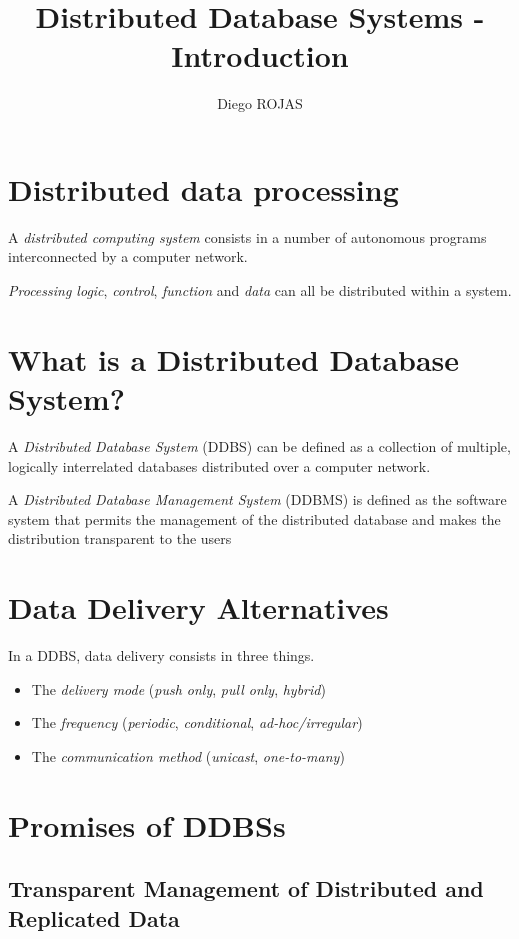 \documentclass[12pt]{article}
\title{Distributed Database Systems - Introduction}
\author{Diego ROJAS}
\begin{document}
\maketitle

\section{Distributed data processing}

A \textit{distributed computing system} consists in a number of autonomous programs interconnected by a computer network.

\textit{Processing logic}, \textit{control}, \textit{function} and \textit{data} can all be distributed within a system.

\section{What is a Distributed Database System?}

A \textit{Distributed Database System} (DDBS) can be defined as a collection of multiple, logically interrelated databases distributed over a computer network.

A \textit{Distributed Database Management System} (DDBMS) is defined as the software system that permits the management of the distributed database and makes the distribution transparent to the users

\section{Data Delivery Alternatives}

In a DDBS, data delivery consists in three things.

\begin{itemize}
	\item The \textit{delivery mode} (\textit{push only}, \textit{pull only}, \textit{hybrid})
	\item The \textit{frequency} (\textit{periodic}, \textit{conditional}, \textit{ad-hoc/irregular})
	\item The \textit{communication method} (\textit{unicast}, \textit{one-to-many})
\end{itemize}

\section{Promises of DDBSs}

\subsection{Transparent Management of Distributed and Replicated Data}
\end{document}
